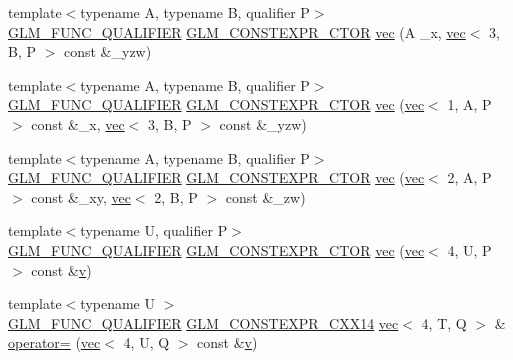 \begin{DoxyCompactItemize}
\item 
{\footnotesize template$<$typename A, typename B, qualifier P$>$ }\\\hyperlink{setup_8hpp_a33fdea6f91c5f834105f7415e2a64407}{G\+L\+M\+\_\+\+F\+U\+N\+C\+\_\+\+Q\+U\+A\+L\+I\+F\+I\+ER} \hyperlink{setup_8hpp_ad34178a09666081abdb573c14d1f4a5a}{G\+L\+M\+\_\+\+C\+O\+N\+S\+T\+E\+X\+P\+R\+\_\+\+C\+T\+OR} \hyperlink{structglm_1_1vec_3_014_00_01_t_00_01_q_01_4_a0f2076b0eb558352f0d57e058e3e9c70}{vec} (A \+\_\+x, \hyperlink{structglm_1_1vec}{vec}$<$ 3, B, P $>$ const \&\+\_\+yzw)
\item 
{\footnotesize template$<$typename A, typename B, qualifier P$>$ }\\\hyperlink{setup_8hpp_a33fdea6f91c5f834105f7415e2a64407}{G\+L\+M\+\_\+\+F\+U\+N\+C\+\_\+\+Q\+U\+A\+L\+I\+F\+I\+ER} \hyperlink{setup_8hpp_ad34178a09666081abdb573c14d1f4a5a}{G\+L\+M\+\_\+\+C\+O\+N\+S\+T\+E\+X\+P\+R\+\_\+\+C\+T\+OR} \hyperlink{structglm_1_1vec_3_014_00_01_t_00_01_q_01_4_a25424f78a9e0345486eeaafbcd1c8a7e}{vec} (\hyperlink{structglm_1_1vec}{vec}$<$ 1, A, P $>$ const \&\+\_\+x, \hyperlink{structglm_1_1vec}{vec}$<$ 3, B, P $>$ const \&\+\_\+yzw)
\item 
{\footnotesize template$<$typename A, typename B, qualifier P$>$ }\\\hyperlink{setup_8hpp_a33fdea6f91c5f834105f7415e2a64407}{G\+L\+M\+\_\+\+F\+U\+N\+C\+\_\+\+Q\+U\+A\+L\+I\+F\+I\+ER} \hyperlink{setup_8hpp_ad34178a09666081abdb573c14d1f4a5a}{G\+L\+M\+\_\+\+C\+O\+N\+S\+T\+E\+X\+P\+R\+\_\+\+C\+T\+OR} \hyperlink{structglm_1_1vec_3_014_00_01_t_00_01_q_01_4_a6273e714a533a4354356ad4a130bf535}{vec} (\hyperlink{structglm_1_1vec}{vec}$<$ 2, A, P $>$ const \&\+\_\+xy, \hyperlink{structglm_1_1vec}{vec}$<$ 2, B, P $>$ const \&\+\_\+zw)
\item 
{\footnotesize template$<$typename U, qualifier P$>$ }\\\hyperlink{setup_8hpp_a33fdea6f91c5f834105f7415e2a64407}{G\+L\+M\+\_\+\+F\+U\+N\+C\+\_\+\+Q\+U\+A\+L\+I\+F\+I\+ER} \hyperlink{setup_8hpp_ad34178a09666081abdb573c14d1f4a5a}{G\+L\+M\+\_\+\+C\+O\+N\+S\+T\+E\+X\+P\+R\+\_\+\+C\+T\+OR} \hyperlink{structglm_1_1vec_3_014_00_01_t_00_01_q_01_4_a057f137a7b9cd18c6277dd4bc7f90335}{vec} (\hyperlink{structglm_1_1vec}{vec}$<$ 4, U, P $>$ const \&\hyperlink{_s_d_l__opengl_8h_a10a82eabcb59d2fcd74acee063775f90}{v})
\item 
{\footnotesize template$<$typename U $>$ }\\\hyperlink{setup_8hpp_a33fdea6f91c5f834105f7415e2a64407}{G\+L\+M\+\_\+\+F\+U\+N\+C\+\_\+\+Q\+U\+A\+L\+I\+F\+I\+ER} \hyperlink{setup_8hpp_a4dd12abf5e1164bc57f3a34671d03844}{G\+L\+M\+\_\+\+C\+O\+N\+S\+T\+E\+X\+P\+R\+\_\+\+C\+X\+X14} \hyperlink{structglm_1_1vec}{vec}$<$ 4, T, Q $>$ \& \hyperlink{structglm_1_1vec_3_014_00_01_t_00_01_q_01_4_a47b604569998091880bd33056928ab50}{operator=} (\hyperlink{structglm_1_1vec}{vec}$<$ 4, U, Q $>$ const \&\hyperlink{_s_d_l__opengl_8h_a10a82eabcb59d2fcd74acee063775f90}{v})

\end{DoxyCompactItemize}
